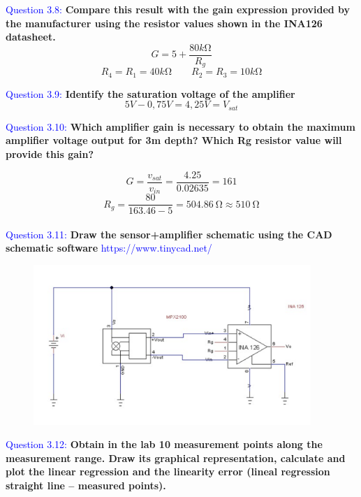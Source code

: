 \documentclass[12pt, a4papre]{article}
\begin{document}
	\textcolor{blue}{Question 3.8:} \textbf{Compare this result with the gain expression provided by the manufacturer using the resistor values shown in the INA126 datasheet.}\\
	\[
		G=5+\frac{80k\si{\ohm}}{R_{g}}
	\]
	\[
		R_{4} =R_{1} =40k\si{\ohm}\qquad
		R_{2} =R_{3} =10k\si{\ohm}
	\]

	\textcolor{blue}{Question 3.9:}\textbf{ Identify the saturation voltage of the amplifier}
	\[
		5 V - 0,75 V = 4,25 V = V_{sat}
	\]

	\textcolor{blue}{Question 3.10:} \textbf{Which amplifier gain is necessary to obtain the maximum amplifier voltage output for 3m depth? Which Rg resistor value will provide this gain?}
	
	\[
		G = \frac{v_{sat}}{v_{in}} = \frac{4.25}{0.02635} =161
	\]
	\[
		R_g = \frac{80}{163.46-5} = \SI{504.86}{\ohm} \approx \SI{510}{\ohm}
	\]
	\\
	\textcolor{blue}{Question 3.11:} \textbf{Draw the sensor+amplifier schematic using the CAD schematic software} \textcolor{blue}{https://www.tinycad.net/}
	
	\begin{figure}[H]
		\begin{center}
		\includegraphics[width=105mm]{CirquitWP3.png}
		\end{center}
	\end{figure}
	
	\newpage
	\textcolor{blue}{Question 3.12:} \textbf{Obtain in the lab 10 measurement points along the measurement range. Draw its graphical representation, calculate and plot the linear regression and the linearity error (lineal regression straight line – measured points). }
	
\end{document}
